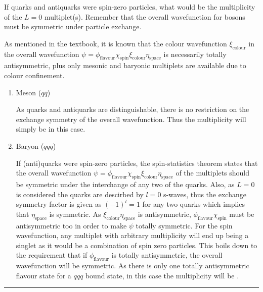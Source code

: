\begin{problem}{9.4}
If quarks and antiquarks were spin-zero particles, what would be the multiplicity of the $L = 0$ multiplet(s). Remember that the overall wavefunction for bosons must be symmetric under particle exchange.
\end{problem}
\begin{solution}
As mentioned in the textbook, it is known that the colour wavefunction $\xi_\text{colour}$ in the  overall wavefunction $\psi=\phi_\text{flavour}\chi_\text{spin}\xi_\text{colour}\eta_\text{space}$ is necessarily totally antisymmetric, plus only mesonic and baryonic multiplets are available due to colour confinement.  
    \begin{enumerate}[label=(\roman*)]
        \item Meson ($q\overbar{q}$)
        
            As quarks and antiquarks are distinguishable, there is no restriction on the exchange symmetry of the overall wavefunction. Thus the multiplicity will simply be  in this case.
        \item Baryon ($qqq$)
        
        If (anti)quarks were spin-zero particles, the spin-statistics theorem states that the overall wavefunction $\psi=\phi_\text{flavour}\chi_\text{spin}\xi_\text{colour}\eta_\text{space}$ of the multiplets should be symmetric under the interchange of any two of the quarks. Also, as $L=0$ is considered the quarks are descirbed by $l=0$ s-waves, thus the exchange symmetry factor is given as $(-1)^l = 1$ for any two quarks which implies that $\eta_\text{space}$ is symmetric. As $\xi_\text{colour}\eta_\text{space}$ is antisymmetric, $\phi_\text{flavour}\chi_\text{spin}$ must be antisymmetric too in order to make $\psi$ totally symmetric. For the spin wavefunction, any multiplet with arbitrary multiplicity will end up being a singlet as it would be a combination of spin zero particles. This boils down to the requirement that if $\phi_\text{flavour}$ is totally antisymmetric, the overall wavefunction will be symmetric. As there is only one totally antisymmetric flavour state for a $qqq$ bound state, in this case the multiplicity will be .
    \end{enumerate}

\end{solution}

\noindent\rule{7in}{1.5pt}


